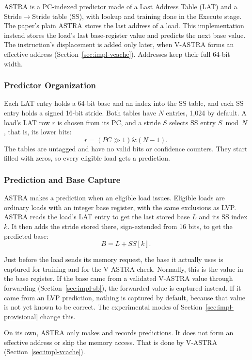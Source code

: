ASTRA is a PC-indexed predictor made of a Last Address Table (LAT)
and a Stride$\rightarrow$Stride table (SS), with lookup and training
done in the Execute stage. The paper's plain ASTRA stores the last
address of a load. This implementation instead stores the load's last
base-register value and predicts the next base value. The instruction's displacement is added only
later, when V-ASTRA forms an effective address
(Section~\ref{sec:impl-vcache}). Addresses keep their full 64-bit
width.

\subsubsection{Predictor Organization}

Each LAT entry holds a 64-bit base and an index into the SS table,
and each SS entry holds a signed 16-bit stride. Both tables have \(N\)
entries, 1,024 by default. A load's LAT row \(r\) is chosen from its
PC, and a stride \(S\) selects SS entry \(S \bmod N\), that is, its
lower bits:
\[
    r = (PC \gg 1) \mathbin{\&} (N-1).
\]
The tables are untagged and have no valid bits or confidence
counters. They start filled with zeros, so every eligible load gets a
prediction.

\subsubsection{Prediction and Base Capture}

ASTRA makes a prediction when an eligible load issues. Eligible loads
are ordinary loads with an integer base register, with the same
exclusions as LVP. ASTRA reads the load's LAT entry to get the
last stored base \(L\) and its SS index \(k\). It then adds the
stride stored there, sign-extended from 16 bits, to get the predicted
base:
\[
    B = L + SS[k].
\]

Just before the load sends its memory request, the base it actually
uses is captured for training and for the V-ASTRA check. Normally,
this is the value in the base register. If the base came from a
validated V-ASTRA value through forwarding
(Section~\ref{sec:impl-sb}), the forwarded value is captured instead.
If it came from an LVP prediction, nothing is captured by default,
because that value is not yet known to be correct. The experimental
modes of Section~\ref{sec:impl-provisional} change this.

On its own, ASTRA only makes and records predictions. It does not
form an effective address or skip the memory access. That is done by
V-ASTRA (Section~\ref{sec:impl-vcache}).

